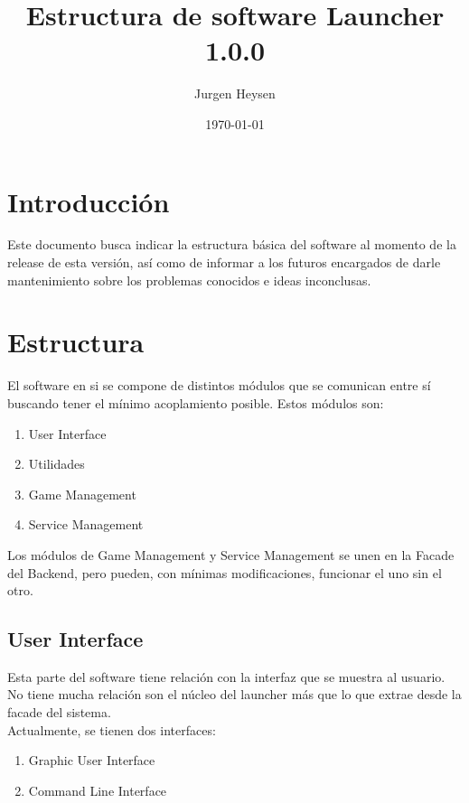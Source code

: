 \documentclass[language=spanish]{article}
\begin{document}
\title{Estructura de software Launcher 1.0.0}
\author{Jurgen Heysen}
\date{\today}
\maketitle
\newpage

\tableofcontents
\newpage

\section{Introducción}

Este documento busca indicar la estructura básica del software al momento de la release de esta versión, así como de informar a los futuros encargados de darle mantenimiento sobre los problemas conocidos e ideas inconclusas.

\section{Estructura}

El software en si se compone de distintos módulos que se comunican entre sí buscando tener el mínimo acoplamiento posible. Estos módulos son:

\begin{enumerate}
	\item User Interface
	\item Utilidades
	\item Game Management
	\item Service Management
\end{enumerate}

Los módulos de Game Management y Service Management se unen en la Facade del Backend, pero pueden, con mínimas modificaciones, funcionar el uno sin el otro.

\subsection{User Interface}

Esta parte del software tiene relación con la interfaz que se muestra al usuario. No tiene mucha relación son el núcleo del launcher más que lo que extrae desde la facade del sistema.\\
Actualmente, se tienen dos interfaces:

\begin{enumerate}
	\item Graphic User Interface
	\item Command Line Interface
\end{enumerate}
\end{document}
